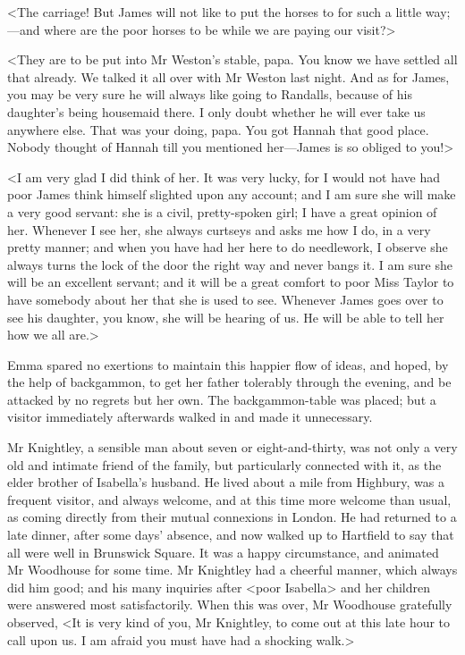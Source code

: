 <The carriage! But James will not like to put the horses to for such a little way;—and where are the poor horses to be while we are paying our visit?>

<They are to be put into Mr Weston's stable, papa. You know we have settled all that already. We talked it all over with Mr Weston last night. And as for James, you may be very sure he will always like going to Randalls, because of his daughter's being housemaid there. I only doubt whether he will ever take us anywhere else. That was your doing, papa. You got Hannah that good place. Nobody thought of Hannah till you mentioned her—James is so obliged to you!>

<I am very glad I did think of her. It was very lucky, for I would not have had poor James think himself slighted upon any account; and I am sure she will make a very good servant: she is a civil, pretty-spoken girl; I have a great opinion of her. Whenever I see her, she always curtseys and asks me how I do, in a very pretty manner; and when you have had her here to do needlework, I observe she always turns the lock of the door the right way and never bangs it. I am sure she will be an excellent servant; and it will be a great comfort to poor Miss Taylor to have somebody about her that she is used to see. Whenever James goes over to see his daughter, you know, she will be hearing of us. He will be able to tell her how we all are.>

Emma spared no exertions to maintain this happier flow of ideas, and hoped, by the help of backgammon, to get her father tolerably through the evening, and be attacked by no regrets but her own. The backgammon-table was placed; but a visitor immediately afterwards walked in and made it unnecessary.

Mr Knightley, a sensible man about seven or eight-and-thirty, was not only a very old and intimate friend of the family, but particularly connected with it, as the elder brother of Isabella's husband. He lived about a mile from Highbury, was a frequent visitor, and always welcome, and at this time more welcome than usual, as coming directly from their mutual connexions in London. He had returned to a late dinner, after some days' absence, and now walked up to Hartfield to say that all were well in Brunswick Square. It was a happy circumstance, and animated Mr Woodhouse for some time. Mr Knightley had a cheerful manner, which always did him good; and his many inquiries after <poor Isabella> and her children were answered most satisfactorily. When this was over, Mr Woodhouse gratefully observed, <It is very kind of you, Mr Knightley, to come out at this late hour to call upon us. I am afraid you must have had a shocking walk.>

